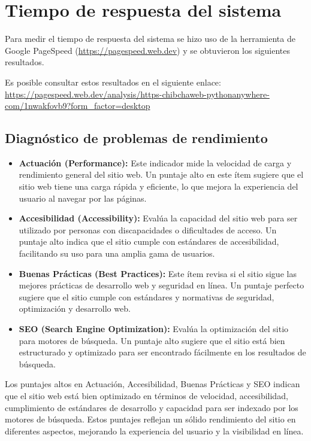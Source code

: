 \documentclass[12pt,a4paper]{article}
\begin{document}
\section{Tiempo de respuesta del sistema}

Para medir el tiempo de respuesta del sistema se hizo uso de la herramienta de Google
PageSpeed (\url{https://pagespeed.web.dev}) y se obtuvieron los siguientes resultados.

Es posible consultar estos resultados en el siguiente enlace:
\url{https://pagespeed.web.dev/analysis/https-chibchaweb-pythonanywhere-com/1nwakfovb9?form_factor=desktop}

\subsection{Diagnóstico de problemas de rendimiento}

\begin{itemize}
  \item \textbf{Actuación (Performance):} Este indicador mide la velocidad de carga y rendimiento general
        del sitio web. Un puntaje alto en este ítem sugiere que el sitio web tiene una carga rápida y
        eficiente, lo que mejora la experiencia del usuario al navegar por las páginas.
  \item \textbf{Accesibilidad (Accessibility):} Evalúa la capacidad del sitio web para ser utilizado por
        personas con discapacidades o dificultades de acceso. Un puntaje alto indica que el sitio
        cumple con estándares de accesibilidad, facilitando su uso para una amplia gama de usuarios.
  \item \textbf{Buenas Prácticas (Best Practices):} Este ítem revisa si el sitio sigue las mejores prácticas de
        desarrollo web y seguridad en línea. Un puntaje perfecto sugiere que el sitio cumple con
        estándares y normativas de seguridad, optimización y desarrollo web.
  \item \textbf{SEO (Search Engine Optimization):} Evalúa la optimización del sitio para motores de
        búsqueda. Un puntaje alto sugiere que el sitio está bien estructurado y optimizado para ser
        encontrado fácilmente en los resultados de búsqueda.
\end{itemize}

Los puntajes altos en Actuación, Accesibilidad, Buenas Prácticas y SEO indican que el sitio
web está bien optimizado en términos de velocidad, accesibilidad, cumplimiento de
estándares de desarrollo y capacidad para ser indexado por los motores de búsqueda. Estos
puntajes reflejan un sólido rendimiento del sitio en diferentes aspectos, mejorando la
experiencia del usuario y la visibilidad en línea.
\end{document}
